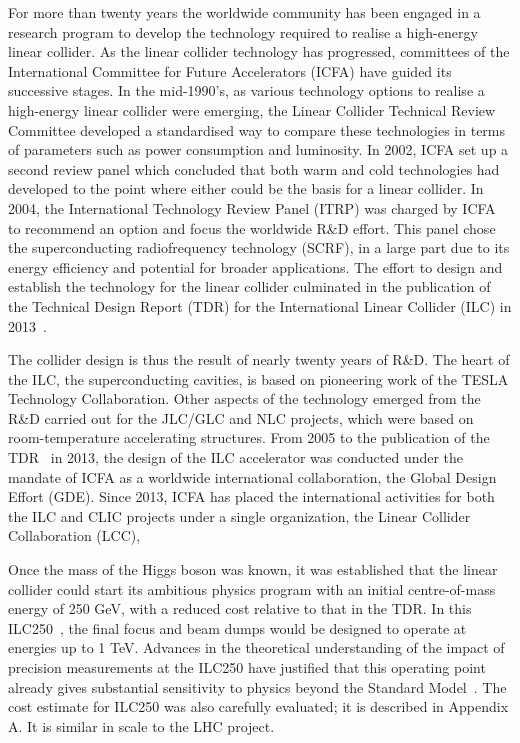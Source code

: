 \documentclass[%
 reprint,
 amsmath,amssymb,
 aps,
]{revtex4-1}
\begin{document}
For more than twenty years the worldwide community has been engaged in
a research program to develop the technology required to realise a
high-energy linear collider.  As the linear collider technology has
progressed,
committees of   the International Committee for Future Accelerators
(ICFA) have  guided its successive stages.
In the mid-1990's, as various technology options to
realise a high-energy linear collider were emerging, the 
Linear Collider Technical Review Committee developed a standardised
way to  compare  these  technologies in terms of parameters such as
power consumption and luminosity. In 2002, ICFA set up a second
review panel which concluded that both warm and cold technologies had
developed to the point where either could be the basis for a linear
collider. In 2004, the  International Technology Review Panel
(ITRP) was charged by ICFA to recommend an option and focus the
worldwide R\&D effort.  This panel chose the  superconducting
radiofrequency technology (SCRF), in a large part due to its
energy efficiency and potential for broader applications. 
The effort to design and
establish the technology for the linear collider culminated in the
publication of the Technical Design Report (TDR) for the International
Linear Collider (ILC) in 2013~\cite{Behnke:2013xla}. 


The collider design is thus the result of nearly twenty years of
R\&D. The heart of the ILC, the superconducting cavities, is based on
pioneering work of the TESLA Technology Collaboration. Other aspects of the 
technology
emerged from the R\&D carried out for the JLC/GLC and NLC projects,
which were based on room-temperature accelerating structures. From
2005 to the publication of the TDR~\cite{Behnke:2013xla} in 2013, the
design of the ILC accelerator was conducted under the mandate of ICFA
as a worldwide
international collaboration, the Global Design Effort (GDE). 
Since 2013, ICFA has placed the  international activities for both the ILC and CLIC
projects under a single organization, 
the Linear Collider Collaboration (LCC),


Once the mass of the Higgs boson was known, it was established that the
linear collider could start its ambitious physics program with an initial centre-of-mass energy of 250 GeV, with a reduced cost relative to that in the TDR.  In this ILC250~\cite{Evans:2017rvt}, the final focus and beam dumps would be designed to operate at energies up to 1 TeV.
Advances in the theoretical understanding of the impact of precision
measurements at the 
 ILC250 have justified that this operating point already gives
 substantial 
sensitivity to physics beyond the Standard 
Model~\cite{Barklow:2017suo,Fujii:2017vwa}. 
 The cost estimate for ILC250 was also carefully evaluated;
it is described in Appendix A. It is similar in scale to the
LHC 
project.
\end{document}
